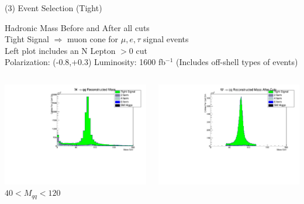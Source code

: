 \documentclass[10pt]{beamer}
\begin{document}
\begin{frame}{(3) Event Selection (Tight)}

Hadronic Mass Before and After all cuts\\
\scriptsize
Tight Signal $\Rightarrow$  muon cone for $\mu,e,\tau$ signal events\\
Left plot includes an N Lepton $> 0$ cut\\
Polarization: (-0.8,+0.3)\quad
Luminosity: 1600 fb$^{-1}$
(Includes off-shell types of events)
\begin{columns}
\begin{column}{0.5\textwidth}
\includegraphics[scale=0.3, left]{mwhadHist.pdf} \\
$ 40 < M_{qq} < 120$
\end{column}
\begin{column}{0.5\textwidth}
\includegraphics[scale=0.3, left]{mwhadCutsHist.pdf} \\

\end{column}
\end{columns}
\end{frame}
\end{document}
